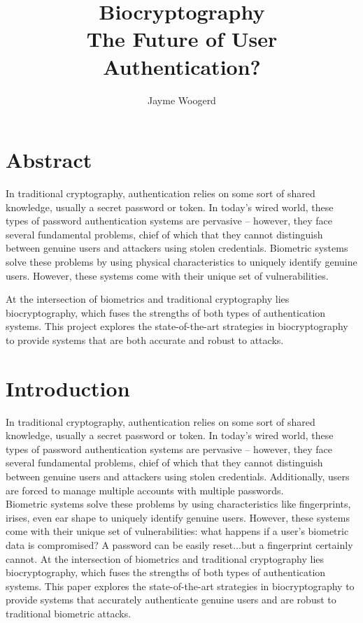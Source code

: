 \documentclass[11pt]{article}
\begin{document}
\author{Jayme Woogerd}
\title{Biocryptography \\ {\large The Future of User Authentication?}}
\maketitle

\section*{Abstract}
In traditional cryptography, authentication relies on some sort of shared knowledge,
usually a secret password or token. In today's wired world, these types of password
authentication systems are pervasive -- however, they face several fundamental
problems, chief of which that they cannot distinguish between genuine users and
attackers using stolen credentials. Biometric systems solve these problems by 
using physical characteristics to uniquely identify genuine users. However, 
these systems come with their unique set of vulnerabilities.

At the intersection of biometrics and traditional cryptography 
lies biocryptography, which fuses the strengths of both types of 
authentication systems. This project explores the state-of-the-art strategies 
in biocryptography to provide systems that are both accurate and robust to attacks.

\doublespacing
\section{Introduction}
In traditional cryptography, authentication relies on some sort of shared knowledge,
usually a secret password or token. In today's wired world, these types of password
authentication systems are pervasive -- however, they face several fundamental
problems, chief of which that they cannot distinguish between genuine users and
attackers using stolen credentials. Additionally, users are forced to manage 
multiple accounts with multiple passwords.  \\
Biometric systems solve these problems by using characteristics like fingerprints,
irises, even ear shape to uniquely identify genuine users. However, these
systems come with their unique set of vulnerabilities: what happens if a user's
biometric data is compromised? A password can be easily reset...but a fingerprint
certainly cannot. At the intersection of biometrics and traditional cryptography
lies biocryptography, which fuses the strengths of both types of authentication systems.
This paper explores the state-of-the-art strategies in biocryptography to
provide systems that accurately authenticate genuine users and are robust to 
traditional biometric attacks.
\end{document}
